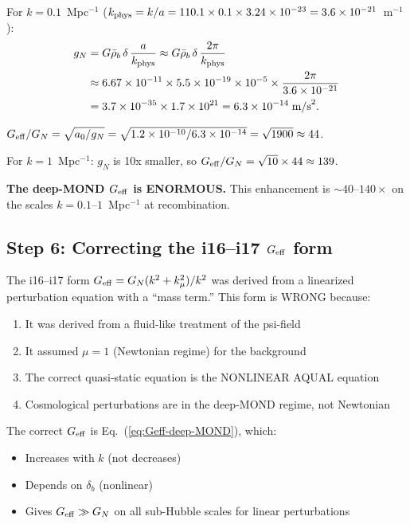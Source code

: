 \documentclass[11pt]{article}
\newcommand{\ee}[1]{\times 10^{#1}}
\newcommand{\Geff}{G_{\rm eff}}
\newcommand{\kmu}{k_\mu}
\begin{document}
For $k = 0.1$~Mpc$^{-1}$ ($k_{\rm phys} = k/a = 110.1\times 0.1\times 3.24\ee{-23}
= 3.6\ee{-21}$~m$^{-1}$):
\begin{align}
g_N &= G\bar\rho_b\,\delta\,\frac{a}{k_{\rm phys}}
\approx G\bar\rho_b\,\delta\,\frac{2\pi}{k_{\rm phys}} \notag\\
&\approx 6.67\ee{-11}\times 5.5\ee{-19}\times 10^{-5}\times \frac{2\pi}{3.6\ee{-21}} \notag\\
&= 3.7\ee{-35}\times 1.7\ee{21} = 6.3\ee{-14}\;\text{m/s}^2.
\end{align}

$\Geff/G_N = \sqrt{a_0/g_N} = \sqrt{1.2\ee{-10}/6.3\ee{-14}} = \sqrt{1900} \approx 44$.

For $k = 1$~Mpc$^{-1}$: $g_N$ is 10x smaller, so
$\Geff/G_N = \sqrt{10}\times 44 \approx 139$.

\textbf{The deep-MOND $\Geff$ is ENORMOUS.} This enhancement is
$\sim 40$--$140\times$ on the scales $k = 0.1$--$1$~Mpc$^{-1}$
at recombination.

\subsection{Step 6: Correcting the i16--i17 $\Geff$ form}

The i16--i17 form $\Geff = G_N(k^2+\kmu^2)/k^2$ was derived from a
linearized perturbation equation with a ``mass term.'' This form
is WRONG because:
\begin{enumerate}
\item It was derived from a fluid-like treatment of the psi-field
\item It assumed $\mu = 1$ (Newtonian regime) for the background
\item The correct quasi-static equation is the NONLINEAR AQUAL equation
\item Cosmological perturbations are in the deep-MOND regime, not Newtonian
\end{enumerate}

The correct $\Geff$ is Eq.~(\ref{eq:Geff-deep-MOND}), which:
\begin{itemize}
\item Increases with $k$ (not decreases)
\item Depends on $\delta_b$ (nonlinear)
\item Gives $\Geff \gg G_N$ on all sub-Hubble scales for linear perturbations
\end{itemize}


\end{document}

